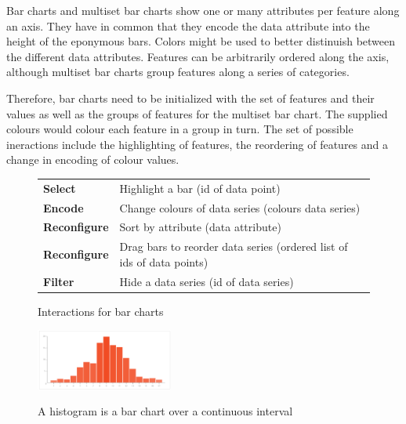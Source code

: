 Bar charts and multiset bar charts show one or many attributes per feature along an axis.
They have in common that they encode the data attribute into the height of the eponymous bars.
Colors might be used to better distinuish between the different data attributes.
Features can be arbitrarily ordered along the axis, although multiset bar charts group features along a series of categories.

Therefore, bar charts need to be initialized with the set of features and their values as well as the groups of features for the multiset bar chart.
The supplied colours would colour each feature in a group in turn.
The set of possible ineractions include the highlighting of features, the reordering of features and a change in encoding of colour values.


\begin{figure}
    \begin{center}
        \caption{Interactions for bar charts}\label{fig:concept:chart-types:bar-charts:interactions}
        {\small
            \begin{tabulary}{\textwidth}{ll}
                \bf Select & Highlight a bar (id of data point) \\
                \bf Encode & Change colours of data series (colours \rightarrow{} data series) \\
                \bf Reconfigure & Sort by attribute (data attribute) \\
                \bf Reconfigure & Drag bars to reorder data series (ordered list of ids of data points) \\
                \bf Filter & Hide a data series (id of data series) \\
            \end{tabulary}
        }
    \end{center}
\end{figure}


\begin{figure}
  \centering
    \includegraphics[width=0.4\textwidth]{images/chartTypes/histogram.png}%
    \label{fig:concept:chart-types:histograms}
    \caption{A histogram is a bar chart over a continuous interval}%
\end{figure}

